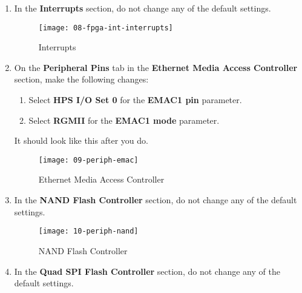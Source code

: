 \begin{flushleft}
\begin{enumerate}[
	label=\textbf{Step \arabic*.},
	leftmargin=*,
	widest={00},
	align=left]
\item In the \textbf{Interrupts} section, do not change any of the default settings.

\begin{figure}[H]
\centering
\texttt{[image: 08-fpga-int-interrupts]}
\caption{Interrupts}
\label{fig:08-fpga-int-interrupts}
\end{figure}

\newpage

\item On the \textbf{Peripheral Pins} tab in the \textbf{Ethernet Media Access Controller} section, make the following changes:

\begin{enumerate}[
	label=\textbf{Step \arabic{enumi}\alph*.},
	leftmargin=*,
	align=left]

\item Select \textbf{HPS I/O Set 0} for the \textbf{EMAC1 pin} parameter.

\item Select \textbf{RGMII} for the \textbf{EMAC1 mode} parameter.

\end{enumerate}

It should look like this after you do.

\begin{figure}[H]
\centering
\texttt{[image: 09-periph-emac]}
\caption{Ethernet Media Access Controller}
\label{fig:09-periph-emac}
\end{figure}

\item In the \textbf{NAND Flash Controller} section, do not change any of the default settings.

\begin{figure}[H]
\centering
\texttt{[image: 10-periph-nand]}
\caption{NAND Flash Controller}
\label{fig:10-periph-nand}
\end{figure}

\item In the \textbf{Quad SPI Flash Controller} section, do not change any of the default settings.


\end{enumerate}
\end{flushleft}
